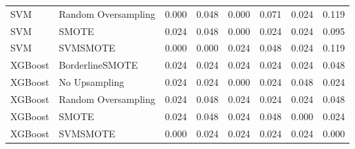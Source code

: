\begin{tabular}{llllllll}
                         SVM & Random Oversampling & 0.000 &                     0.048 &                 0.000 &                  0.071 &                                   0.024 &     0.119 \\
                         SVM &               SMOTE & 0.024 &                     0.048 &                 0.000 &                  0.024 &                                   0.024 &     0.095 \\
                         SVM &            SVMSMOTE & 0.000 &                     0.000 &                 0.024 &                  0.048 &                                   0.024 &     0.119 \\
                     XGBoost &     BorderlineSMOTE & 0.024 &                     0.024 &                 0.024 &                  0.024 &                                   0.024 &     0.048 \\
                     XGBoost &       No Upsampling & 0.024 &                     0.024 &                 0.000 &                  0.024 &                                   0.048 &     0.024 \\
                     XGBoost & Random Oversampling & 0.024 &                     0.048 &                 0.024 &                  0.024 &                                   0.024 &     0.048 \\
                     XGBoost &               SMOTE & 0.024 &                     0.048 &                 0.024 &                  0.048 &                                   0.000 &     0.024 \\
                     XGBoost &            SVMSMOTE & 0.000 &                     0.024 &                 0.024 &                  0.024 &                                   0.024 &     0.000 \\
\bottomrule
\end{tabular}

